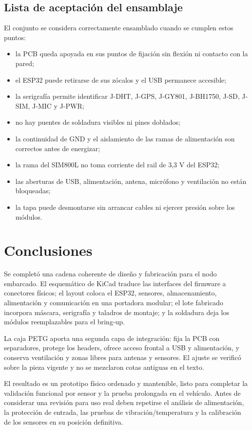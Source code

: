 \documentclass[11pt,a4paper,oneside]{report}
\begin{document}
\section{Lista de aceptación del ensamblaje}

El conjunto se considera correctamente ensamblado cuando se cumplen estos puntos:

\begin{itemize}
  \item la PCB queda apoyada en sus puntos de fijación sin flexión ni contacto con
        la pared;
  \item el ESP32 puede retirarse de sus zócalos y el USB permanece accesible;
  \item la serigrafía permite identificar J-DHT, J-GPS, J-GY801, J-BH1750, J-SD,
        J-SIM, J-MIC y J-PWR;
  \item no hay puentes de soldadura visibles ni pines doblados;
  \item la continuidad de GND y el aislamiento de las ramas de alimentación son
        correctos antes de energizar;
  \item la rama del SIM800L no toma corriente del rail de 3,3 V del ESP32;
  \item las aberturas de USB, alimentación, antena, micrófono y ventilación no están
        bloqueadas;
  \item la tapa puede desmontarse sin arrancar cables ni ejercer presión sobre los
        módulos.
\end{itemize}

\chapter{Conclusiones}

Se completó una cadena coherente de diseño y fabricación para el nodo embarcado.
El esquemático de KiCad traduce las interfaces del firmware a conectores físicos;
el layout coloca el ESP32, sensores, almacenamiento, alimentación y comunicación
en una portadora modular; el lote fabricado incorpora máscara, serigrafía y
taladros de montaje; y la soldadura deja los módulos reemplazables para el bring-up.

La caja PETG aporta una segunda capa de integración: fija la PCB con separadores,
protege los headers, ofrece acceso frontal a USB y alimentación, y conserva
ventilación y zonas libres para antenas y sensores. El ajuste se verificó sobre la
pieza vigente y no se mezclaron cotas antiguas en el texto.

El resultado es un prototipo físico ordenado y mantenible, listo para completar la
validación funcional por sensor y la prueba prolongada en el vehículo. Antes de
considerar una revisión para uso real deben repetirse el análisis de alimentación,
la protección de entrada, las pruebas de vibración/temperatura y la calibración de
los sensores en su posición definitiva.
\end{document}

